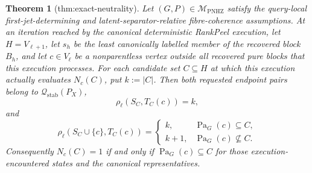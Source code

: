 \documentclass{article}
\newtheorem{theorem}{Theorem}
\begin{document}
\begin{theorem}[thm:exact-neutrality]\label{thm:exact-neutrality}
Let \((G,P)\in\mathcal M_{\mathrm{PNHZ}}\) satisfy the query-local first-jet-determining and latent-separator-relative fibre-coherence assumptions.  At an iteration reached by the canonical deterministic RankPeel execution, let \(H=V_{\ell+1}\), let \(s_h\) be the least canonically labelled member of the recovered block \(B_h\), and let \(c\in V_\ell\) be a nonparentless vertex outside all recovered pure blocks that this execution processes.  For each candidate set \(C\subseteq H\) at which this execution actually evaluates \(N_c(C)\), put \(k:=|C|\).  Then both requested endpoint pairs belong to \(\mathcal Q_{\mathrm{stab}}(P_X)\),
\[
 \rho_\ell(S_C,T_C(c))=k,
\]
and
\[
 \rho_\ell(S_C\cup\{c\},T_C(c))=
 \begin{cases}
 k,&\operatorname{Pa}_G(c)\subseteq C,\\
 k+1,&\operatorname{Pa}_G(c)\nsubseteq C.
 \end{cases}
\]
Consequently \(N_c(C)=1\) if and only if \(\operatorname{Pa}_G(c)\subseteq C\) for those execution-encountered states and the canonical representatives.
\end{theorem}
\end{document}
